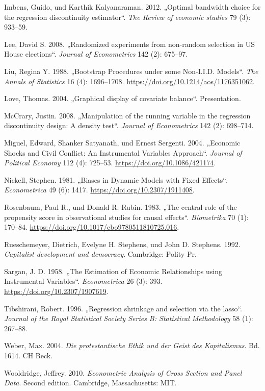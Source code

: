 \documentclass[
  a4paper,
  DIV=11,
  oneside]{scrreprt}
\newlength{\cslhangindent}
\newenvironment{CSLReferences}[2] %
 {\begin{list}{}{%
  \setlength{\itemindent}{0pt}
  \setlength{\leftmargin}{0pt}
  \setlength{\parsep}{0pt}
  \ifodd #1
   \setlength{\leftmargin}{\cslhangindent}
   \setlength{\itemindent}{-1\cslhangindent}
  \fi
  \setlength{\itemsep}{#2\baselineskip}}}
 {\end{list}}
\begin{document}
\begin{CSLReferences}{1}{0}
Imbens, Guido, und Karthik Kalyanaraman. 2012. {„Optimal bandwidth
choice for the regression discontinuity estimator``}. \emph{The Review
of economic studies} 79 (3): 933--59.

Lee, David S. 2008. {„Randomized experiments from non-random selection
in US House elections``}. \emph{Journal of Econometrics} 142 (2):
675--97.

Liu, Regina Y. 1988. {„Bootstrap Procedures under some Non-I.I.D.
Models``}. \emph{The Annals of Statistics} 16 (4): 1696--1708.
\url{https://doi.org/10.1214/aos/1176351062}.

Love, Thomas. 2004. {„Graphical display of covariate balance``}.
Presentation.

McCrary, Justin. 2008. {„Manipulation of the running variable in the
regression discontinuity design: A density test``}. \emph{Journal of
Econometrics} 142 (2): 698--714.

Miguel, Edward, Shanker Satyanath, und Ernest Sergenti. 2004. {„Economic
Shocks and Civil Conflict: An Instrumental Variables Approach``}.
\emph{Journal of Political Economy} 112 (4): 725--53.
\url{https://doi.org/10.1086/421174}.

Nickell, Stephen. 1981. {„Biases in Dynamic Models with Fixed
Effects``}. \emph{Econometrica} 49 (6): 1417.
\url{https://doi.org/10.2307/1911408}.

Rosenbaum, Paul R., und Donald R. Rubin. 1983. {„The central role of the
propensity score in observational studies for causal effects``}.
\emph{Biometrika} 70 (1): 170--84.
\url{https://doi.org/10.1017/cbo9780511810725.016}.

Rueschemeyer, Dietrich, Evelyne H. Stephens, und John D. Stephens. 1992.
\emph{Capitalist development and democracy}. Cambridge: Polity Pr.

Sargan, J. D. 1958. {„The Estimation of Economic Relationships using
Instrumental Variables``}. \emph{Econometrica} 26 (3): 393.
\url{https://doi.org/10.2307/1907619}.

Tibshirani, Robert. 1996. {„Regression shrinkage and selection via the
lasso``}. \emph{Journal of the Royal Statistical Society Series B:
Statistical Methodology} 58 (1): 267--88.

Weber, Max. 2004. \emph{Die protestantische Ethik und der Geist des
Kapitalismus}. Bd. 1614. CH Beck.

Wooldridge, Jeffrey. 2010. \emph{Econometric Analysis of Cross Section
and Panel Data}. Second edition. Cambridge, Massachusetts: MIT.

\end{CSLReferences}
\end{document}
